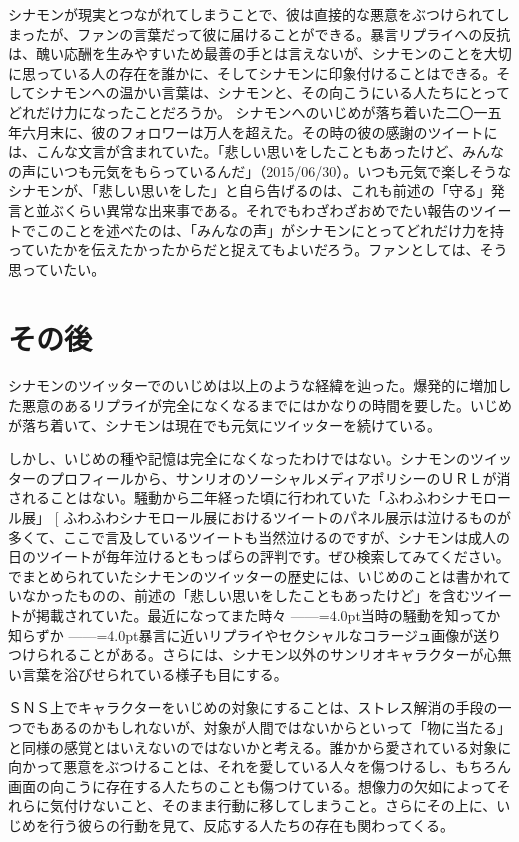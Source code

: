 \documentclass[b5j,twoside,twocolumn]{utarticle}
\makeatletter
\def\yakuchu{%
\@ifnextchar[\@xfootnote %
{\stepcounter{yakuchu}%
\protected@xdef\@thefnmark{\theyakuchu}%
\@footnotemark\@footnotetext}}
\makeatother
\begin{document}
シナモンが現実とつながれてしまうことで、彼は直接的な悪意をぶつけられてしまったが、ファンの言葉だって彼に届けることができる。暴言リプライへの反抗は、醜い応酬を生みやすいため最善の手とは言えないが、シナモンのことを大切に思っている人の存在を誰かに、そしてシナモンに印象付けることはできる。そしてシナモンへの温かい言葉は、シナモンと、その向こうにいる人たちにとってどれだけ力になったことだろうか。
シナモンへのいじめが落ち着いた二〇一五年六月末に、彼のフォロワーは万人を超えた。その時の彼の感謝のツイートには、こんな文言が含まれていた。「悲しい思いをしたこともあったけど、みんなの声にいつも元気をもらっているんだ」（2015/06/30）。いつも元気で楽しそうなシナモンが、「悲しい思いをした」と自ら告げるのは、これも前述の「守る」発言と並ぶくらい異常な出来事である。それでもわざわざおめでたい報告のツイートでこのことを述べたのは、「みんなの声」がシナモンにとってどれだけ力を持っていたかを伝えたかったからだと捉えてもよいだろう。ファンとしては、そう思っていたい。


\section*{その後}
シナモンのツイッターでのいじめは以上のような経緯を辿った。爆発的に増加した悪意のあるリプライが完全になくなるまでにはかなりの時間を要した。いじめが落ち着いて、シナモンは現在でも元気にツイッターを続けている。


しかし、いじめの種や記憶は完全になくなったわけではない。シナモンのツイッターのプロフィールから、サンリオのソーシャルメディアポリシーのＵＲＬが消されることはない。騒動から二年経った頃に行われていた「ふわふわシナモロール展」\yakuchu{ふわふわシナモロール展におけるツイートのパネル展示は泣けるものが多くて、ここで言及しているツイートも当然泣けるのですが、シナモンは成人の日のツイートが毎年泣けるともっぱらの評判です。ぜひ検索してみてください。}でまとめられていたシナモンのツイッターの歴史には、いじめのことは書かれていなかったものの、前述の「悲しい思いをしたこともあったけど」を含むツイートが掲載されていた。最近になってまた時々\tbaselineshift =2.5pt ------\tbaselineshift =4.0pt当時の騒動を知ってか知らずか\tbaselineshift =2.5pt ------\tbaselineshift =4.0pt暴言に近いリプライやセクシャルなコラージュ画像が送りつけられることがある。さらには、シナモン以外のサンリオキャラクターが心無い言葉を浴びせられている様子も目にする。


ＳＮＳ上でキャラクターをいじめの対象にすることは、ストレス解消の手段の一つでもあるのかもしれないが、対象が人間ではないからといって「物に当たる」と同様の感覚とはいえないのではないかと考える。誰かから愛されている対象に向かって悪意をぶつけることは、それを愛している人々を傷つけるし、もちろん画面の向こうに存在する人たちのことも傷つけている。想像力の欠如によってそれらに気付けないこと、そのまま行動に移してしまうこと。さらにその上に、いじめを行う彼らの行動を見て、反応する人たちの存在も関わってくる。
\end{document}
